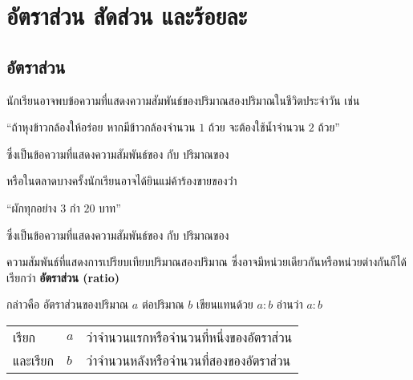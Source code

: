 \documentclass[
  a4paper,
  DIV=11,
  numbers=noendperiod]{scrartcl}
\author{พิริยพงศ์ หริ่งรอด}
\date{26 May 2025}
\begin{document}
\lhead{}
\chead{- \thepage \ -}
\renewcommand{\headrulewidth}{0.4pt}
\lfoot{\today}
\cfoot{}
\renewcommand{\footrulewidth}{0.4pt}


\section{อัตราส่วน สัดส่วน
และร้อยละ}\label{uxe2duxe15uxe23uxe32uxe2auxe27uxe19-uxe2auxe14uxe2auxe27uxe19-uxe41uxe25uxe30uxe23uxe2duxe22uxe25uxe30}

\subsection{อัตราส่วน}\label{uxe2duxe15uxe23uxe32uxe2auxe27uxe19}

นักเรียนอาจพบข้อความที่แสดงความสัมพันธ์ของปริมาณสองปริมาณในชีวิตประจำวัน เช่น

\centering

``ถ้าหุงข้าวกล้องให้อร่อย หากมีข้าวกล้องจำนวน \(1\) ถ้วย จะต้องใช้น้ำจำนวน \(2\)
ถ้วย''

\flushleft

ซึ่งเป็นข้อความที่แสดงความสัมพันธ์ของ \makebox[3cm]{\dotfill} กับ ปริมาณของ
\makebox[3cm]{\dotfill}

หรือในตลาดบางครั้งนักเรียนอาจได้ยินแม่ค้าร้องขายของว่่า

\centering

``ผักทุกอย่าง \(3\) กำ \(20\) บาท''

\flushleft

ซึ่งเป็นข้อความที่แสดงความสัมพันธ์ของ \makebox[3cm]{\dotfill} กับ ปริมาณของ
\makebox[3cm]{\dotfill}

\begin{mybox}

ความสัมพันธ์ที่แสดงการเปรียบเทียบปริมาณสองปริมาณ ซึ่งอาจมีหน่วยเดียวกันหรือหน่วยต่างกันก็ได้ เรียกว่า \textbf{\textcolor{NavyBlue}{อัตราส่วน (ratio)}}

\end{mybox}

กล่าวคือ อัตราส่วนของปริมาณ \(a\) ต่อปริมาณ \(b\) เขียนแทนด้วย \(a:b\) อ่านว่า
\(a:b\)

\renewcommand{\arraystretch}{1.5}

\begin{tabular}{lll}
เรียก    & $a$ & ว่าจำนวนแรกหรือจำนวนที่หนึ่งของอัตราส่วน \\
และเรียก & $b$ &ว่าจำนวนหลังหรือจำนวนที่สองของอัตราส่วน \\
\end{tabular}
\end{document}
